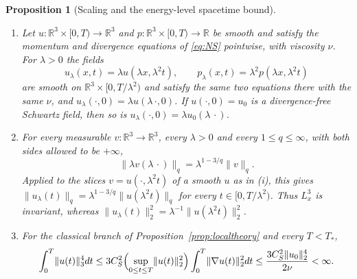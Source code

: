 \documentclass[11pt]{article}
\newtheorem{proposition}[theorem]{Proposition}
\theoremstyle{definition}
\theoremstyle{plain}
\newcommand{\R}{\mathbb R}
\newcommand{\norm}[1]{\lVert #1\rVert}
\begin{document}
\begin{proposition}[Scaling and the energy-level spacetime bound]\label{prop:scaling}
\begin{enumerate}
\item[(i)] Let $u\colon\R^3\times[0,T)\to\R^3$ and
$p\colon\R^3\times[0,T)\to\R$ be smooth and satisfy the momentum and
divergence equations of \eqref{eq:NS} pointwise, with viscosity $\nu$.  For
$\lambda>0$ the fields
\[
 u_\lambda(x,t)=\lambda u(\lambda x,\lambda^2t),\qquad
 p_\lambda(x,t)=\lambda^2p(\lambda x,\lambda^2t)
\]
are smooth on $\R^3\times[0,T/\lambda^2)$ and satisfy the same two
equations there with the same $\nu$, and $u_\lambda(\cdot,0)=\lambda u(\lambda\,\cdot,0)$.
If $u(\cdot,0)=u_0$ is a divergence-free Schwartz field, then so is
$u_\lambda(\cdot,0)=\lambda u_0(\lambda\,\cdot)$.
\item[(ii)] For every measurable $v\colon\R^3\to\R^3$, every $\lambda>0$ and
every $1\le q\le\infty$, with both sides allowed to be $+\infty$,
\begin{equation}\label{eq:scaling-norm}
 \norm{\lambda v(\lambda\,\cdot)}_q=\lambda^{1-3/q}\norm{v}_q .
\end{equation}
Applied to the slices $v=u(\cdot,\lambda^2t)$ of a smooth $u$ as in (i),
this gives $\norm{u_\lambda(t)}_q=\lambda^{1-3/q}\norm{u(\lambda^2t)}_q$
for every $t\in[0,T/\lambda^2)$.  Thus $L^3_x$ is invariant, whereas
$\norm{u_\lambda(t)}_2^2=\lambda^{-1}\norm{u(\lambda^2t)}_2^2$.
\item[(iii)] For the classical branch of Proposition~\ref{prop:localtheory}
and every $T<T_*$,
\begin{equation}\label{eq:L4L3}
 \int_0^T\norm{u(t)}_3^4dt
 \le 3C_S^2\Bigl(\sup_{0\le t\le T}\norm{u(t)}_2^2\Bigr)
      \int_0^T\norm{\nabla u(t)}_2^2dt
 \le\frac{3C_S^2\norm{u_0}_2^4}{2\nu}<\infty .
\end{equation}
\end{enumerate}
\end{proposition}
\end{document}
